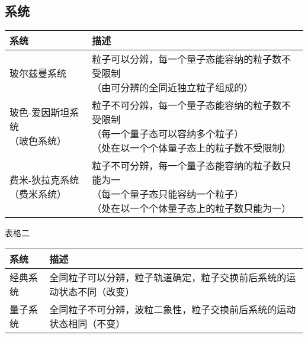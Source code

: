 \subsection{系统}
\begin{tabularx}{\textwidth}{|l|X|}
\hline
\textbf{系统} & \textbf{描述} \\ 
\hline
玻尔兹曼系统 & 
\makecell[l]{粒子可以分辨，每一个量子态能容纳的粒子数不受限制\\（由可分辨的全同近独立粒子组成的）} \\
\hline
\makecell[l]{玻色-爱因斯坦系统\\（玻色系统）} & 
\makecell[l]{粒子不可分辨，每一个量子态能容纳的粒子数不受限制\\（每一个量子态可以容纳多个粒子）\\（处在以一个个体量子态上的粒子数不受限制）} \\
\hline
\makecell[l]{费米-狄拉克系统\\（费米系统）} & 
\makecell[l]{粒子不可分辨，每一个量子态能容纳的粒子数只能为一\\（每一个量子态只能容纳一个粒子）\\（处在以一个个体量子态上的粒子数只能为一）} \\
\hline
\end{tabularx}

表格二
\\  %
\begin{tabularx}{\textwidth}{|l|X|}
\hline
\textbf{系统} & \textbf{描述} \\ 
\hline
经典系统 & 
全同粒子可以分辨，粒子轨道确定，粒子交换前后系统的运动状态不同（改变） \\
\hline
量子系统 & 
全同粒子不可分辨，波粒二象性，粒子交换前后系统的运动状态相同（不变） \\
\hline
\end{tabularx}





